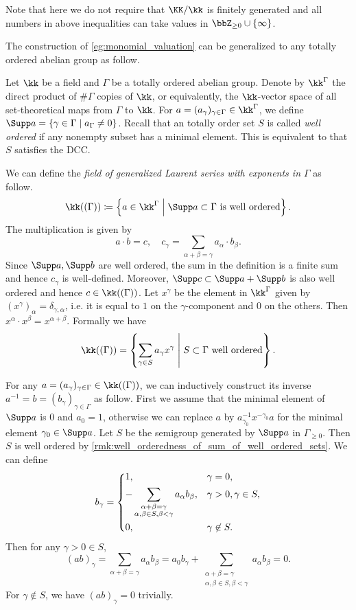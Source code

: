 Note that here we do not require that $\KK/\kk$ is finitely generated and all numbers in above inequalities can take values in $\bbZ_{\geq 0} \cup \{\infty\}$.

The construction of \cref{eg:monomial_valuation} can be generalized to any totally ordered abelian group as follow.

\begin{construction}
	Let $\kk$ be a field and $\Gamma$ be a totally ordered abelian group.
	Denote by $\kk^\Gamma$ the direct product of $\# \Gamma$ copies of $\kk$,
	or equivalently, the $\kk$-vector space of all set-theoretical maps from $\Gamma$ to $\kk$.
	For $a = (a_\gamma)_{\gamma \in \Gamma} \in \kk^{\Gamma}$, we define $\Supp a = \{\gamma \in \Gamma \;|\; a_\Gamma \neq 0 \}$.
	Recall that an totally order set $S$ is called \emph{well ordered} if any nonempty subset has a minimal element.
	This is equivalent to that $S$ satisfies the DCC.

	We can define the \emph{field of generalized Laurent series with exponents in $\Gamma$} as follow.
	\[ \kk((\Gamma)) \coloneqq \left\{ a \in \kk^{\Gamma} \;\middle|\; \Supp a \subset \Gamma \text{ is well ordered} \right\}. \]
	The multiplication is given by
	\[ a \cdot b = c, \quad c_\gamma = \sum_{\alpha+\beta = \gamma} a_\alpha \cdot b_\beta. \]
	Since $\Supp a, \Supp b$ are well ordered, the sum in the definition is a finite sum and hence $c_\gamma$ is well-defined.
	Moreover, $\Supp c \subset \Supp a + \Supp b$ is also well ordered and hence $c \in \kk((\Gamma))$.
	Let $x^\gamma$ be the element in $\kk^\Gamma$ given by $(x^\gamma)_\alpha = \delta_{\gamma,\alpha}$, i.e. it is equal to $1$ on the $\gamma$-component and $0$ on the others.
	Then $x^\alpha \cdot x^\beta = x^{\alpha + \beta}$.
	Formally we have
	\[ \kk((\Gamma)) = \left\{ \sum_{\gamma \in S} a_\gamma x^\gamma \;\middle|\; S \subset \Gamma \text{ well ordered} \right\}. \]

	For any $a = (a_\gamma)_{\gamma \in \Gamma} \in \kk((\Gamma))$, we can inductively construct its inverse $a^{-1} = b = (b_\gamma)_{\gamma \in \Gamma}$ as follow.
	First we assume that the minimal element of $\Supp a$ is $0$ and $a_0 = 1$, otherwise we can replace $a$ by $a_{\gamma_0}^{-1} x^{-\gamma_0} a$ for the minimal element $\gamma_0 \in \Supp a$.
	Let $S$ be the semigroup generated by $\Supp a$ in $\Gamma_{\geq 0}$.
	Then $S$ is well ordered by \cref{rmk:well_orderedness_of_sum_of_well_ordered_sets}.
	We can define
	\[ b_\gamma = \begin{dcases}
			1, & \gamma = 0,                       \\
			-\sum_{\substack{\alpha+\beta = \gamma \\ \alpha,\beta \in S, \beta < \gamma}} a_\alpha b_\beta, & \gamma > 0, \gamma \in S, \\
			0, & \gamma \not\in S.
		\end{dcases} \]
	Then for any $\gamma> 0 \in S$,
	\[ (ab)_\gamma = \sum_{\alpha+\beta = \gamma} a_\alpha b_\beta = a_0 b_\gamma + \sum_{\substack{\alpha+\beta = \gamma \\ \alpha,\beta \in S, \beta < \gamma}} a_\alpha b_\beta = 0. \]
	For $\gamma \not\in S$, we have $(ab)_\gamma = 0$ trivially.


\end{construction}
